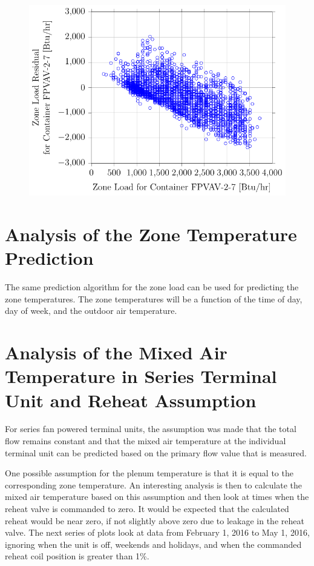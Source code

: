 \begin{figure}
\centering
\includegraphics[]{Plots/2016-09-14-1020-ZoneLoadResidualforContainerFPVAV27vsZoneLoadforContainerFPVAV27.pdf}
\caption{  }
\label{fig:2016-09-14-1020-ZoneLoadResidualforContainerFPVAV27vsZoneLoadforContainerFPVAV27}
\end{figure}



\section{Analysis of the Zone Temperature Prediction} 

The same prediction algorithm for the zone load can be used for
predicting the zone temperatures. The zone temperatures will be a
function of the time of day, day of week, and the outdoor air
temperature. 


\section{Analysis of the Mixed Air Temperature in Series Terminal Unit and Reheat Assumption}

For series fan powered terminal units, the assumption was made that the total
flow remains constant and that the mixed air temperature at the
individual terminal unit can be predicted based on the primary flow value that is
measured. 

One possible assumption for the plenum temperature is that it is equal
to the corresponding zone temperature. An interesting analysis is then
to calculate the mixed air temperature based on this assumption and then
look at times when the reheat valve is commanded to zero. It would be
expected that the calculated reheat would be near zero, if not slightly
above zero due to leakage in the reheat valve.
The next series of plots look at data from February 1, 2016 to May 1, 2016, ignoring when the unit is off, weekends and holidays, and when the commanded reheat coil position is greater than 1\%. 

